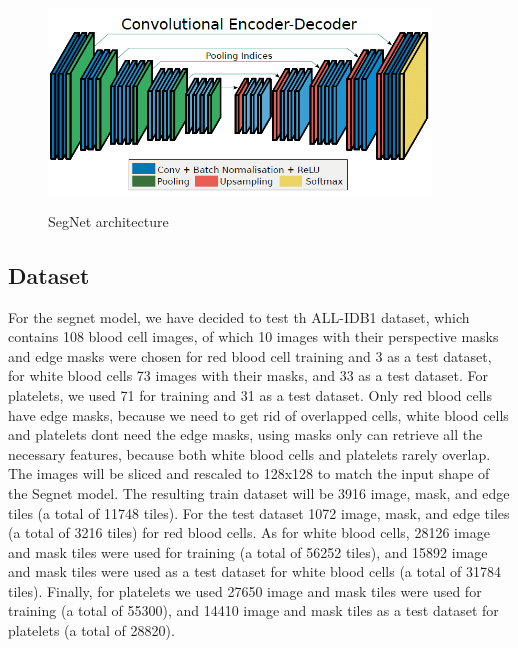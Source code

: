 \vspace{0.2in}

\begin{figure}[H]
\centering
  \vspace{-0.1in}
    \centerline{\includegraphics[width = 4in, height = 2.2in]{../images/segnet.png}}
    \caption{SegNet architecture}
\end{figure}

\subsection{Dataset}
For the segnet model, we have decided to test th ALL-IDB1 dataset, which contains 108 blood cell images, of which 10 images with their perspective masks and edge masks were chosen for red blood cell training and 3 as a test dataset, for white blood cells 73 images with their masks, and 33 as a test dataset.
For platelets, we used 71 for training and 31 as a test dataset.
Only red blood cells have edge masks, because we need to get rid of overlapped cells, white blood cells and platelets dont need the edge masks, using masks only can retrieve all the necessary features, because both white blood cells and platelets rarely overlap.
The images will be sliced and rescaled to 128x128 to match the input shape of the Segnet model.
The resulting train dataset will be 3916 image, mask, and edge tiles (a total of 11748 tiles).
For the test dataset 1072 image, mask, and edge tiles (a total of 3216 tiles) for red blood cells.
As for white blood cells, 28126 image and mask tiles were used for training (a total of 56252 tiles), and 15892 image and mask tiles were used as a test dataset for white blood cells (a total of 31784 tiles).
Finally, for platelets we used 27650 image and mask tiles were used for training (a total of 55300), and 14410 image and mask tiles as a test dataset for platelets (a total of 28820).

\vspace{0.1in}

